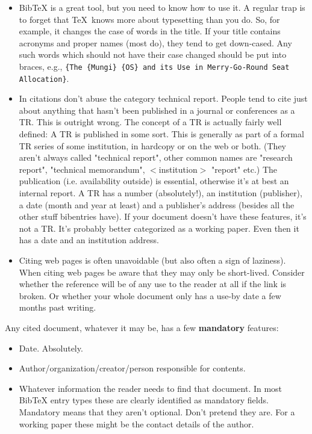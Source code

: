 \begin{itemize}
\item BibTeX is a great tool, but you need to know how to use it. A regular trap is to forget that \TeX~knows more about typesetting than you do. So, for example, it changes the case of words in the title. If your title contains acronyms and proper names (most do), they tend to get down-cased. Any such words which should not have their case changed should be put into braces, e.g., \verb|{The {Mungi} {OS} and its Use in Merry-Go-Round Seat Allocation}|.


\item In citations don't abuse the category technical report. People tend to cite just about anything that hasn't been published in a journal or conferences as a TR. This is outright wrong. The concept of a TR is actually fairly well defined: A TR is published in some sort. This is generally as part of a formal TR series of some institution, in hardcopy or on the web or both. (They aren't always called "technical report", other common names are "research report", "technical memorandum", $<$institution$>$ "report" etc.) The publication (i.e. availability outside) is essential, otherwise it's at best an internal report.
A TR has a number (absolutely!), an institution (publisher), a date (month and year at least) and a publisher's address (besides all the other stuff bibentries have).
If your document doesn't have these features, it's not a TR. It's probably better categorized as a working paper. Even then it has a date and an institution address.

\item Citing web pages is often unavoidable (but also often a sign of laziness). When citing web pages be aware that they may only be short-lived. Consider whether the reference will be of any use to the reader at all if the link is broken. Or whether your whole document only has a use-by date a few months past writing.

\end{itemize}

Any cited document, whatever it may be, has a few \textbf{mandatory} features:
\begin{itemize}
	\item Date. Absolutely.
	\item Author/organization/creator/person responsible for contents.
	\item Whatever information the reader needs to find that document. In most BibTeX entry types these are clearly identified as mandatory fields. Mandatory means that they aren't optional. Don't pretend they are. For a working paper these might be the contact details of the author.
\end{itemize}


